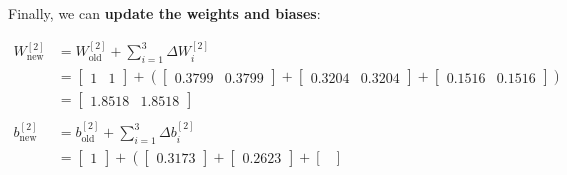 \documentclass[12pt]{article}
\begin{document}
\begin{enumerate}[leftmargin=\labelsep]
\begin{paracol}{3}
          \end{paracol}

          Finally, we can \textbf{update the weights and biases}:

          $$
              \begin{aligned}
                  W^{[2]}_{\text{new}} & = W^{[2]}_{\text{old}} + \sum_{i=1}^{3} \Delta W^{[2]}_i \\
                                       & = \begin{bmatrix}
                                               1 & 1
                                           \end{bmatrix} + \left(
                  \begin{bmatrix}
                          0.3799 & 0.3799
                      \end{bmatrix}+
                  \begin{bmatrix}
                          0.3204 & 0.3204
                      \end{bmatrix}+
                  \begin{bmatrix}
                          0.1516 & 0.1516
                      \end{bmatrix}
                  \right)                                                                         \\
                                       & = \begin{bmatrix}
                                               1.8518 & 1.8518
                                           \end{bmatrix}
                  \\
                  \\
                  b^{[2]}_{\text{new}} & = b^{[2]}_{\text{old}} + \sum_{i=1}^{3} \Delta b^{[2]}_i \\
                                       & = \begin{bmatrix}
                                               1
                                           \end{bmatrix} + \left(
                  \begin{bmatrix}
                          0.3173
                      \end{bmatrix}+
                  \begin{bmatrix}
                          0.2623
                      \end{bmatrix}+
                  \begin{bmatrix}

\end{bmatrix}
\end{aligned}$$
\end{enumerate}
\end{document}
